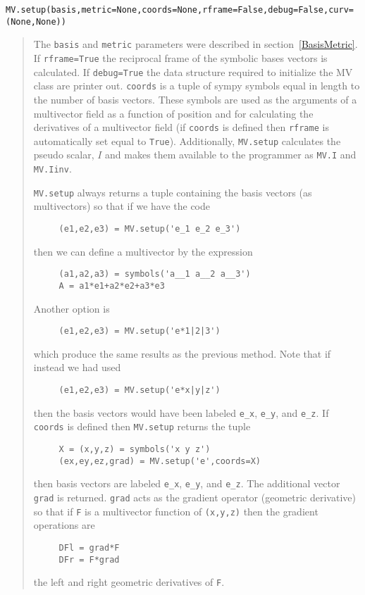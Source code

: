 \documentclass[10pt]{article}
\newcommand{\T}[1]{\texttt{#1}}
\begin{document}
\T{MV.setup(basis,metric=None,coords=None,rframe=False,debug=False,curv=(None,None))}
\begin{quote}
   The \T{basis} and \T{metric} parameters were described in section~\ref{BasisMetric}. If
   \T{rframe=True} the reciprocal frame of the symbolic bases vectors is calculated.
   If \T{debug=True} the data structure required to initialize the MV class
   are printer out. \T{coords} is a tuple of sympy symbols equal in length to
   the number of basis vectors.  These symbols are used as the arguments of a
   multivector field as a function of position and for calculating the derivatives
   of a multivector field (if \T{coords} is defined then \T{rframe} is automatically
   set equal to \T{True}). Additionally, \T{MV.setup} calculates the pseudo scalar,
   $I$ and makes them available to the programmer as \T{MV.I} and \T{MV.Iinv}.

   \T{MV.setup} always returns a tuple containing the basis vectors (as multivectors)
   so that if we have the code

\begin{lstlisting}
     (e1,e2,e3) = MV.setup('e_1 e_2 e_3')
\end{lstlisting}
   then we can define a multivector by the expression
\begin{lstlisting}
     (a1,a2,a3) = symbols('a__1 a__2 a__3')
     A = a1*e1+a2*e2+a3*e3
\end{lstlisting}
Another option is 
\begin{lstlisting}
     (e1,e2,e3) = MV.setup('e*1|2|3')
\end{lstlisting}
which produce the same results as the previous method. Note that if instead we had used
\begin{lstlisting}
     (e1,e2,e3) = MV.setup('e*x|y|z')
\end{lstlisting}
then the basis vectors would have been labeled \T{e\_x}, \T{e\_y}, and \T{e\_z}.  If \T{coords} is 
defined then \T{MV.setup} returns the tuple
\begin{lstlisting}
     X = (x,y,z) = symbols('x y z')
     (ex,ey,ez,grad) = MV.setup('e',coords=X)
\end{lstlisting}
   then basis vectors are labeled \T{e\_x}, \T{e\_y}, and \T{e\_z}.  The additional vector \T{grad} is returned.  
   \T{grad} acts as the gradient operator (geometric derivative) so that if \T{F} is a multivector function 
   of \T{(x,y,z)} then the gradient operations are
\begin{lstlisting}
     DFl = grad*F
     DFr = F*grad
\end{lstlisting}
   the left and right geometric derivatives of \T{F}.


\end{quote}
\end{document}

